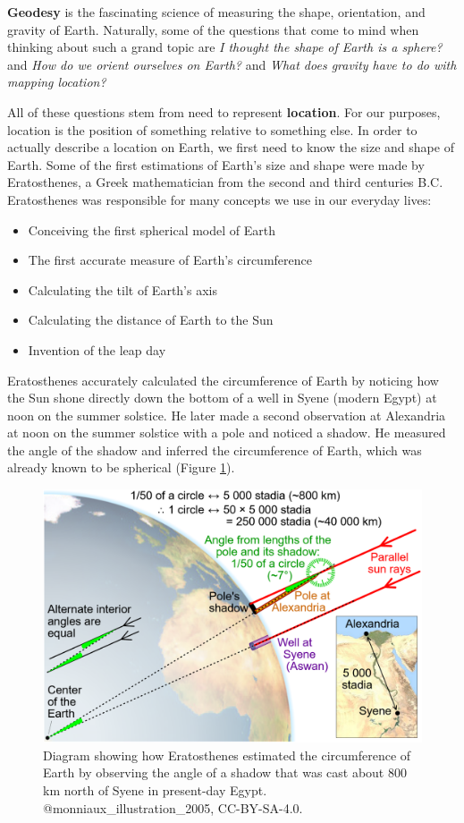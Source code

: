 \documentclass[
]{book}
\providecommand{\tightlist}{%
  \setlength{\itemsep}{0pt}\setlength{\parskip}{0pt}}
\begin{document}
\textbf{Geodesy} is the fascinating science of measuring the shape, orientation, and gravity of Earth. Naturally, some of the questions that come to mind when thinking about such a grand topic are \emph{I thought the shape of Earth is a sphere?} and \emph{How do we orient ourselves on Earth?} and \emph{What does gravity have to do with mapping location?}

All of these questions stem from need to represent \textbf{location}. For our purposes, location is the position of something relative to something else. In order to actually describe a location on Earth, we first need to know the size and shape of Earth. Some of the first estimations of Earth's size and shape were made by Eratosthenes, a Greek mathematician from the second and third centuries B.C. Eratosthenes was responsible for many concepts we use in our everyday lives:

\begin{itemize}
\tightlist
\item
  Conceiving the first spherical model of Earth
\item
  The first accurate measure of Earth's circumference
\item
  Calculating the tilt of Earth's axis
\item
  Calculating the distance of Earth to the Sun
\item
  Invention of the leap day
\end{itemize}

Eratosthenes accurately calculated the circumference of Earth by noticing how the Sun shone directly down the bottom of a well in Syene (modern Egypt) at noon on the summer solstice. He later made a second observation at Alexandria at noon on the summer solstice with a pole and noticed a shadow. He measured the angle of the shadow and inferred the circumference of Earth, which was already known to be spherical (Figure \ref{fig:2-Eratosthenes}).

\begin{figure}
\includegraphics[width=0.75\linewidth]{images/02-Eratosthenes} \caption{Diagram showing how Eratosthenes estimated the circumference of Earth by observing the angle of a shadow that was cast about 800 km north of Syene in present-day Egypt. @monniaux_illustration_2005, CC-BY-SA-4.0.}\label{fig:2-Eratosthenes}
\end{figure}
\end{document}
